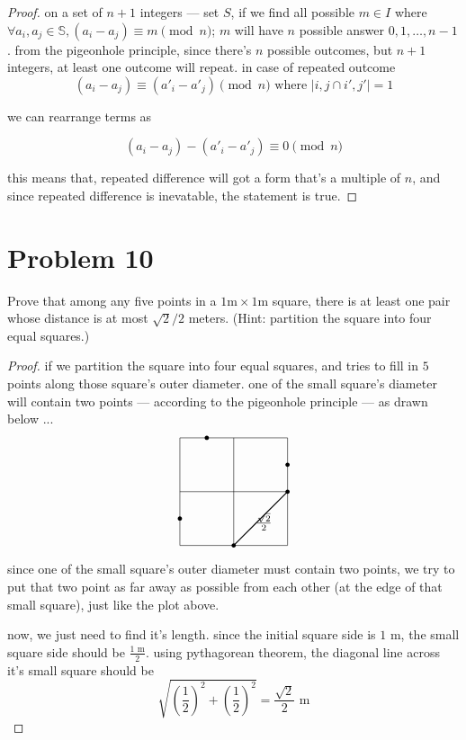  \begin{proof}

  on a set of $n + 1$ integers --- set $S$, if we find all
  possible $m \in I$ where $\forall a_i, a_j \in \mathbb{S}, (a_i
  - a_j) \equiv m \pmod{n}$; $m$ will have $n$ possible answer $0,
  1, \dots, n-1$. from the pigeonhole principle, since there's $n$
  possible outcomes, but $n + 1$ integers, at least one outcome will
  repeat. in case of repeated outcome
  \[
  (a_i - a_j) \equiv (a'_i - a'_j) \pmod{n} \text{ where } |{i,j} \cap {i',j'}| = 1 
  \]

  we can rearrange terms as

  \[
  (a_i-a_j) - (a'_i - a'_j) \equiv 0 \pmod{n}
  \]

  this means that, repeated difference will got a form that's a
  multiple of $n$, and since repeated difference is inevatable, the
  statement is true.

 \end{proof}

\hrulefill

\section*{Problem 10}
Prove that among any five points in a $1\text{m} \times 1\text{m}$ square, there is at least one pair whose distance is at most $\sqrt{2}/2$ meters. (Hint: partition the square into four equal squares.)

\medskip
\solution

 \begin{proof}
  
  if we partition the square into four equal squares, and tries to
  fill in $5$ points along those square's outer diameter. one of the
  small square's diameter will contain two points --- according to the
  pigeonhole principle --- as drawn below ...
  \[
  \begin{tikzpicture}[scale=3]
  \draw (0,0) rectangle (1,1);
  \draw (0.5,0)--(0.5,1);
  \draw (0,0.5)--(1,0.5);
  \fill (0.25,1) circle (0.02);
  \fill (1,0.75) circle (0.02);
  \fill (0,0.25) circle (0.02);
  \fill (0.5,0) circle (0.02);
  \fill (1,0.5) circle (0.02);
  \draw[thick] (0.5,0)--(1,0.5);
  \node at (0.78,0.22) {$\frac{\sqrt{2}}{2}$};
  \end{tikzpicture}
  \]
  since one of the small square's outer diameter must contain two
  points, we try to put that two point as far away as possible from
  each other (at the edge of that small square), just like the plot
  above.
  
  \vspace{1em}

  now, we just need to find it's length. since the initial square
  side is $1 \text{ m}$, the small square side should be $\frac{1
  \text{ m}}{2}$. using pythagorean theorem, the diagonal line across
  it's small square should be
  \[
  \sqrt{\left(\frac{1}{2}\right)^2 + \left(\frac{1}{2}\right)^2} =
     \boxed{\frac{\sqrt{2}}{2} \text{ m}}
  \]

 \end{proof}

\vspace{1em}
\hrulefill


